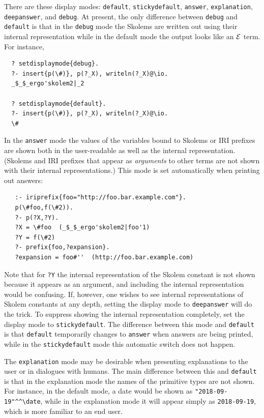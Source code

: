 \documentclass[11pt]{article}
\newcommand{\ERGO}{\mbox{\ensuremath{\cal{E}}\smaller{{\sc{RGO}}}}\xspace}
\newcommand{\FLSYSTEM}{\ERGO}
\begin{document}
There are these display modes:
\texttt{default}, \texttt{stickydefault},
\texttt{answer}, \texttt{explanation},
\texttt{deepanswer},  and \texttt{debug}.
At present, the only difference between \texttt{debug} and \texttt{default}
is that in the \texttt{debug} mode
the Skolems are written out using their internal representation while in
the default mode the output looks like an \FLSYSTEM term.
For instance,
\begin{verbatim}
  ? setdisplaymode{debug}.
  ?- insert{p(\#)}, p(?_X), writeln(?_X)@\io.
  _$_$_ergo'skolem2|_2

  ? setdisplaymode{default}.
  ?- insert{p(\#)}, p(?_X), writeln(?_X)@\io.
  \#
\end{verbatim}
In the \texttt{answer} mode the values of the
variables bound to Skolems or IRI prefixes are shown
both in the user-readable as well as the internal representation. 
(Skolems and IRI prefixes that appear as \emph{arguments} to other terms are not shown with their
internal representations.)
This mode is set automatically when printing out answers:
\begin{verbatim}
   :- iriprefix{foo="http://foo.bar.example.com"}.
   p(\#foo,f(\#2)).
   ?- p(?X,?Y).
   ?X = \#foo  (_$_$_ergo'skolem2|foo'1)
   ?Y = f(\#2)
   ?- prefix{foo,?expansion}.
   ?expansion = foo#''  (http://foo.bar.example.com)
\end{verbatim}
Note that for \texttt{?Y} the internal representation of the Skolem
constant is not shown because it appears as an argument, and including the
internal representation would be confusing. If, however, one wishes to
see internal representations of Skolem constants at any depth, setting the
display mode to \texttt{deepanswer} will do the trick. 
To suppress showing the internal representation completely, set the display
mode to \texttt{stickydefault}. 
The difference between this mode and \texttt{default} is that
\texttt{default} temporarily changes to \texttt{answer} when answers are
being printed, while in the \texttt{stickydefault} mode this automatic
switch does not happen.

The \texttt{explanation} mode may be desirable when presenting explanations
to the user or in dialogues with humans.
The main difference between this and \texttt{default}
is that in the explanation mode the names of the primitive types are not
shown. For instance, in the default mode, a date would be shown as
\verb|"2018-09-19"^^\date|, while in the explanation mode it will appear
simply as \verb|2018-09-19|, which is more familiar to an end user.
\end{document}
